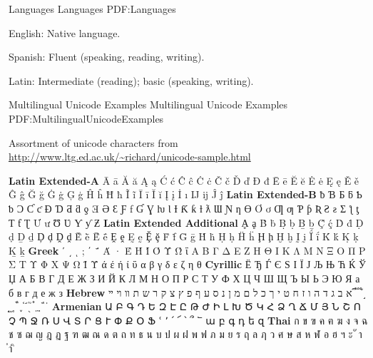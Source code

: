 \documentclass[letterpaper,MMMyyyy,nonstopmode]{simpleresumecv}
\begin{document}
\begin{Body}

\Section
{Languages}
{Languages}
{PDF:Languages}

\BulletItem
English: Native language.

\Gap
\BulletItem
Spanish: Fluent (speaking, reading, writing).

\Gap
\BulletItem
Latin: Intermediate (reading); basic (speaking, writing).





\Section
{Multilingual Unicode Examples}
{Multilingual Unicode Examples}
{PDF:MultilingualUnicodeExamples}

\BulletItem
Assortment of unicode characters from
\href{http://www.ltg.ed.ac.uk/~richard/unicode-sample.html}
{\url{http://www.ltg.ed.ac.uk/~richard/unicode-sample.html}}

\begin{Detail}
\Item
\textbf{Latin Extended-A}
Ā ā Ă ă Ą ą Ć ć Ĉ ĉ Ċ ċ Č č Ď ď Đ đ Ē ē Ĕ ĕ Ė ė Ę ę Ě ě Ĝ ĝ Ğ ğ Ġ ġ Ģ ģ Ĥ ĥ Ħ ħ Ĩ ĩ Ī ī Ĭ ĭ Į į İ ı Ĳ ĳ Ĵ ĵ
\textbf{Latin Extended-B}
ƀ Ɓ Ƃ ƃ Ƅ ƅ Ɔ Ƈ ƈ Ɖ Ɗ Ƌ ƌ ƍ Ǝ Ə Ɛ Ƒ ƒ Ɠ Ɣ ƕ Ɩ Ɨ Ƙ ƙ ƚ ƛ Ɯ Ɲ ƞ Ɵ Ơ ơ Ƣ ƣ Ƥ ƥ Ʀ Ƨ ƨ Ʃ ƪ ƫ Ƭ ƭ Ʈ Ư ư Ʊ Ʋ Ƴ ƴ Ƶ
\textbf{Latin Extended Additional}
Ḁ ḁ Ḃ ḃ Ḅ ḅ Ḇ ḇ Ḉ ḉ Ḋ ḋ Ḍ ḍ Ḏ ḏ Ḑ ḑ Ḓ ḓ Ḕ ḕ Ḗ ḗ Ḙ ḙ Ḛ ḛ Ḝ ḝ Ḟ ḟ Ḡ ḡ Ḣ ḣ Ḥ ḥ Ḧ ḧ Ḩ ḩ Ḫ ḫ Ḭ ḭ Ḯ ḯ Ḱ ḱ Ḳ ḳ Ḵ ḵ
\textbf{Greek}
ʹ ͵ ͺ ; ΄ ΅ Ά · Έ Ή Ί Ό Ύ Ώ ΐ Α Β Γ Δ Ε Ζ Η Θ Ι Κ Λ Μ Ν Ξ Ο Π Ρ Σ Τ Υ Φ Χ Ψ Ω Ϊ Ϋ ά έ ή ί ΰ α β γ δ ε ζ η θ
\textbf{Cyrillic}
Ё Ђ Ѓ Є Ѕ І Ї Ј Љ Њ Ћ Ќ Ў Џ А Б В Г Д Е Ж З И Й К Л М Н О П Р С Т У Ф Х Ц Ч Ш Щ Ъ Ы Ь Э Ю Я а б в г д е ж з
\textbf{Hebrew}
א ב ג ד ה ו ז ח ט י ך כ ל ם מ ן נ ס ע ף פ ץ צ ק ר ש ת װ ױ ײ ֝ ֞ ֟ ֠ ֡ ֣ ֤ ֥ ֦ ֧ ֨ ֩ ֪ ֫ ֬ ֭ ֮ ֯ ְ ֱ ֒ ֓ ֔
\textbf{Armenian}
{\UseSecondaryFont
Ա Բ Գ Դ Ե Զ Է Ը Թ Ժ Ի Լ Խ Ծ Կ Հ Ձ Ղ Ճ Մ Յ Ն Շ Ո Չ Պ Ջ Ռ Ս Վ Տ Ր Ց Ւ Փ Ք Օ Ֆ ՙ ՚ ՛ ՜ ՝ ՞ ՟ ա բ գ դ ե զ}
\textbf{Thai}
{\UseSecondaryFont
ก ข ฃ ค ฅ ฆ ง จ ฉ ช ซ ฌ ญ ฎ ฏ ฐ ฑ ฒ ณ ด ต ถ ท ธ น บ ป ผ ฝ พ ฟ ภ ม ย ร ฤ ล ฦ ว ศ ษ ส ห ฬ อ ฮ ฯ ะ ั า ำ ิ}
\end{Detail}

\newpage


\begingroup
\color{red}


\end{Body}
\end{document}
